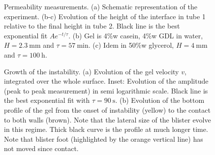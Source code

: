 \documentclass[twocolumn,superscriptaddress,showpacs,preprintnumbers,amsmath,amssymb,prl]{revtex4-1}
\begin{document}
\begin{figure*}
	
	\caption{Permeability measurements. (a) Schematic representation of the experiment. (b-c) Evolution of the height of the interface in tube 1 relative to the final height in tube 2. Black line is the best exponential fit $Ae^{-t/\tau}$. (b) Gel is 4\%w casein, 4\%w GDL in water, $H=\SI{2.3}{\milli\metre}$ and $\tau=\SI{57}{\minute}$. (c) Idem in 50\%w glycerol, $H=\SI{4}{\milli\metre}$ and $\tau=\SI{100}{\hour}$.}
	\label{fig:permeability}
\end{figure*}

\begin{figure}
	
	\caption{Growth of the instability. (a) Evolution of the gel velocity $v$, integrated over the whole surface. Inset: Evolution of the amplitude (peak to peak measurement) in semi logarithmic scale. Black line is the best exponential fit with $\tau=\SI{90}{\second}$. (b) Evolution of the bottom profile of the gel from the onset of instability (yellow) to the contact to both walls (brown). Note that the lateral size of the blister evolve in this regime. Thick black curve is the profile at much longer time. Note that blister foot (highlighted by the orange vertical line) has not moved since contact.}
	\label{fig:growth}
\end{figure}
\end{document}
